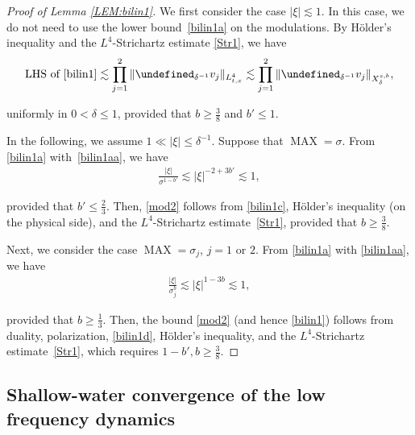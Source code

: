 \documentclass[letterpaper, 11pt,  reqno]{amsart}
\DeclareMathOperator{\MAX}{MAX}
\newcommand{\1}{\hspace{0.5mm}\textup{I}\hspace{0.5mm}}
\newcommand{\noi}{\noindent}
\let\P= \undefined
\newcommand{\P}{\mathbf{P}}
\newcommand{\dl}{\delta}
\newcommand{\s}{\sigma}
\newcommand{\les}{\lesssim}
\numberwithin{equation}{section}
\numberwithin{theorem}{section}
\begin{document}
\begin{proof}[Proof of Lemma \ref{LEM:bilin1}]
We first consider the case $|\xi |\les 1$.
In this case, 
we do not need to use the lower bound~\eqref{bilin1a} 
on the modulations.
By H\"older's inequality and  the $L^4$-Strichartz estimate \eqref{Str1}, we have
\begin{align*}
\text{LHS of \eqref{bilin1}}
\les \prod_{j = 1}^2 \| \P_{ \dl^{-1}} v_j\|_{L^4_{t, x}}
\les \prod_{j = 1}^2 \| \P_{ \dl^{-1}} v_j\|_{X^{s, b}_\dl}, 
\end{align*}

\noi
uniformly in $0 < \dl \le 1$, provided that
$b \ge \frac 38$
and 
 $b' \le 1$.






In the following, we assume $1 \ll |\xi|\le  \dl^{-1}$.
Suppose that 
$\MAX = \s$.
From \eqref{bilin1a} with~\eqref{bilin1aa}, we have 
\begin{align}
\frac{ |\xi|}{\s^{1-b'}}
\les |\xi|^{-2 + 3b'}
\les 1,
\label{bilin1c} 
\end{align}

\noi
provided that $b' \le \frac 23 $.
Then, \eqref{mod2} follows from \eqref{bilin1c}, 
H\"older's inequality (on the physical side), and the $L^4$-Strichartz estimate~\eqref{Str1}, 
provided that $b \ge \frac 38$.


Next, we consider the case
$\MAX = \s_j$, $j = 1$ or $2$.
From \eqref{bilin1a} with \eqref{bilin1aa}, we have 
\begin{align}
\frac{ |\xi|}{\s_j^{b}}
\les |\xi|^{1-3b}
\les 1,
\label{bilin1d} 
\end{align}

\noi
provided that $b \ge \frac 13  $.
Then, the bound \eqref{mod2}
(and hence \eqref{bilin1})
follows from 
duality, polarization,  
\eqref{bilin1d}, 
H\"older's inequality, and the $L^4$-Strichartz estimate~\eqref{Str1}, 
which requires $1 - b', b \ge \frac 38$.
\end{proof}



















\subsection{Shallow-water convergence of the low frequency dynamics}
\label{SUBSEC:A}
\end{document}
